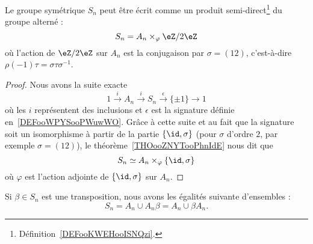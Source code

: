 \begin{proposition}      \label{PROPooPSZVooSmAgPA}
    Le groupe symétrique \( S_n\) peut être écrit comme un produit semi-direct\footnote{Définition~\ref{DEFooKWEHooISNQzi}.} du groupe alterné :
    \begin{equation}
        S_n=A_n\times_{\varphi}\eZ/2\eZ
    \end{equation}
    où l'action de \( \eZ/2\eZ\) sur \( A_n\) est la conjugaison par \( \sigma=(12)\), c'est-à-dire \( \rho(-1)\tau=\sigma\tau\sigma^{-1}\).
\end{proposition}

\begin{proof}
    Nous avons la suite exacte
    \begin{equation}
        1\stackrel{i}{\longrightarrow}A_n\stackrel{i}{\longrightarrow}S_n\stackrel{\epsilon}{\longrightarrow}\{ \pm 1 \}\longrightarrow 1
    \end{equation}
    où les \( i\) représentent des inclusions et \( \epsilon\) est la signature définie en~\ref{DEFooWPYSooPWuwWO}. Grâce à cette suite et au fait que la signature soit un isomorphisme à partir de la partie \( \{ \id,\sigma \}\) (pour \( \sigma\) d'ordre \( 2\), par exemple \( \sigma=(12)\)), le théorème~\ref{THOooZNYTooPhnIdE} nous dit que
    \begin{equation}
        S_n\simeq A_n\times_{\varphi}\{ \id,\sigma \}
    \end{equation}
    où \( \varphi\) est l'action adjointe de \( \{ \id,\sigma \}\) sur \( A_n\).
\end{proof}

\begin{proposition}     \label{PROPooZOWBooIMxxlj}
    Si \( \beta\in S_n\) est une transposition, nous avons les égalités suivante d'ensembles :
    \begin{equation}
        S_n=A_n\cup A_n\beta=A_n\cup \beta A_n.
    \end{equation}
\end{proposition}

